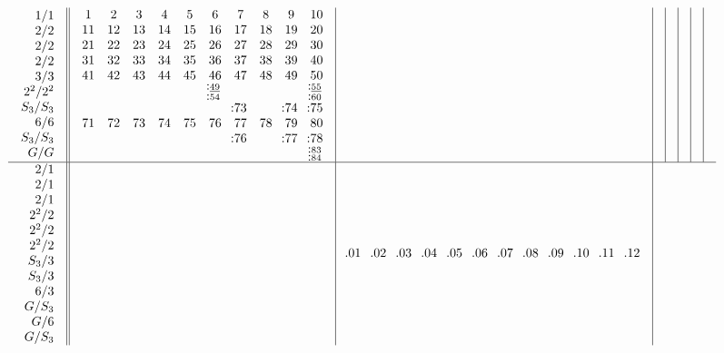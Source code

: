 \documentclass[12pt,a4paper]{amsart}
\begin{document}
\newpage
\scriptsize {}
\begin{align*}
  \begin{array}{r||c|c|c|c|c|c|c}
    \begin{array}{r}
      1/1 \\ 2/2 \\ 2/2 \\ 2/2 \\ 3/3 \\ 2^2/2^2 \\ S_3/S_3 \\ 6/6 \\ S_3/S_3 \\ G/G
    \end{array}
    &
    \begin{array}{cccccccccc}
1&2&3&4&5&6&7&8&9&10\\
11&12&13&14&15&16&17&18&19&20\\
21&22&23&24&25&26&27&28&29&30\\
31&32&33&34&35&36&37&38&39&40\\
41&42&43&44&45&46&47&48&49&50\\
&&&&&^{\llap:\underline{49}}_{\llap:54}&&&&^{\llap:\underline{55}}_{\llap:60}\\
&&&&&&\llap:73&&\llap:74&\llap:75\\
71&72&73&74&75&76&77&78&79&80\\
&&&&&&\llap:76&&\llap:77&\llap:78\\
&&&&&&&&&^{\llap:83}_{\llap:84}\\
    \end{array}
&&&&&&\\\hline
    \begin{array}{r}
      2/1 \\ 2/1 \\ 2/1 \\ 2^2/2 \\ 2^2/2 \\ 2^2/2 \\ S_3/3 \\ S_3/3 \\ 6/3 \\ G/S_3 \\ G/6 \\ G/S_3
    \end{array}
&
&
  \begin{array}{cccccccccccc}
\llap{.}01&\llap{.}02&\llap{.}03&\llap{.}04&\llap{.}05&\llap{.}06&\llap{.}07&\llap{.}08&\llap{.}09&\llap{.}10&\llap{.}11&\llap{.}12\\

\end{array}
\end{array}
\end{align*}
\end{document}
